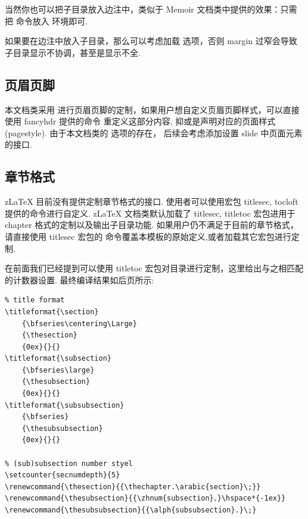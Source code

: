 当然你也可以把子目录放入边注中，类似于 Memoir 文档类中提供的效果：只需把 \cmd{\partialToc} 命令放入 \cmd{\marginpar} 环境即可.

\begin{remark}
如果要在边注中放入子目录，那么可以考虑加载  选项，否则 margin 过窄会导致子目录显示不协调，甚至是显示不全.
\end{remark}

\subsection{页眉页脚}
本文档类采用  进行页眉页脚的定制，如果用户想自定义页眉页脚样式，可以直接使用 fancyhdr 提供的命令
\cmd{\fancyhead, \fancyfoot} 重定义这部分内容, 抑或是声明对应的页面样式(pagestyle). 由于本文档类的  选项的存在，
后续会考虑添加设置 slide 中页面元素的接口.

\subsection{章节格式}\label{counter-settings}
z\LaTeX{} 目前没有提供定制章节格式的接口. 使用者可以使用宏包 {titlesec, tocloft} 提供的命令进行自定义. z\LaTeX{}
文档类默认加载了 {titlesec, titletoc} 宏包进用于 chapter 格式的定制以及输出子目录功能. 如果用户仍不满足于目前的章节格式，
请直接使用 {titlesec} 宏包的 \cmd{\titleformat} 命令覆盖本模板的原始定义,或者加载其它宏包进行定制. 

在前面我们已经提到可以使用 {titletoc} 宏包对目录进行定制，这里给出与之相匹配的计数器设置. 最终编译结果如后页所示:
\begin{verbatim}
% title format
\titleformat{\section}
    {\bfseries\centering\Large}
    {\thesection}
    {0ex}{}{}
\titleformat{\subsection}
    {\bfseries\large}
    {\thesubsection}
    {0ex}{}{}
\titleformat{\subsubsection}
    {\bfseries}
    {\thesubsubsection}
    {0ex}{}{}

% (sub)subsection number styel
\setcounter{secnumdepth}{5}
\renewcommand{\thesection}{{\thechapter.\arabic{section}\;}}
\renewcommand{\thesubsection}{{\zhnum{subsection}、}\hspace*{-1ex}}
\renewcommand{\thesubsubsection}{{\alph{subsubsection}.}\;}
\end{verbatim}

